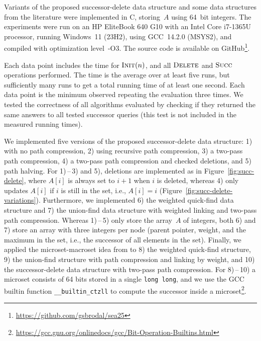 \documentclass[a4paper]{lipics-v2021}
\newcommand{\FuncName}[1]{\textup{\textsc{#1}}}
\newcommand{\Init}{\FuncName{Init}}
\newcommand{\Delete}{\FuncName{Delete}}
\newcommand{\Succ}{\FuncName{Succ}}
\begin{document}
Variants of the proposed successor-delete data structure and some data structures from the literature were implemented in C, storing~$A$ using 64~bit integers. The experiments were run on an HP EliteBook 640 G10 with an Intel Core i7-1365U processor, running Windows~11 (23H2), using GCC~14.2.0 (MSYS2), and compiled with optimization level~-O3. The source code is available on GitHub\footnote{\url{https://github.com/gsbrodal/sea25}}.

Each data point includes the time for $\Init(n)$, and all $\Delete$ and $\Succ$ operations performed. The time is the average over at least five runs, but sufficiently many runs to get a total running time of at least one second. Each data point is the minimum observed repeating the evaluation three times. We tested the correctness of all algorithms evaluated by checking if they returned the same answers to all tested successor queries (this test is not included in the measured running times).

We implemented five versions of the proposed successor-delete data structure:
1) with no path compression,
2) using recursive path compression,
3) a two-pass path compression,
4) a two-pass path compression and checked deletions, and
5) path halving.
For 1)\,--\,3) and 5), deletions are implemented as in Figure~\ref{fig:succ-delete}, where $A[i]$ is always set to $i+1$ when $i$ is deleted, whereas 4) only updates $A[i]$ if $i$ is still in the set, i.e., $A[i]=i$ (Figure~\ref{fig:succ-delete-variations}). Furthermore, we implemented
6) the weighted quick-find data structure and
7) the union-find data structure with weighted linking and two-pass path compression. Whereas 1)\,--\,5) only store the array~$A$ of integers, both 6) and 7) store an array with three integers per node (parent pointer, weight, and the maximum in the set, i.e., the successor of all elements in the set).
Finally, we applied the microset-macroset idea from \cite{GabowTarjan85} to
8) the weighted quick-find structure,
9) the union-find structure with path compression and linking by weight, and
10) the successor-delete data structure with two-pass path compression.
For 8)\,--\,10) a microset consists of 64 bits stored in a single \verb|long long|, and we use the GCC builtin function \verb|__builtin_ctzll| to compute the successor inside a microset\footnote{\url{https://gcc.gnu.org/onlinedocs/gcc/Bit-Operation-Builtins.html}}.
\end{document}
